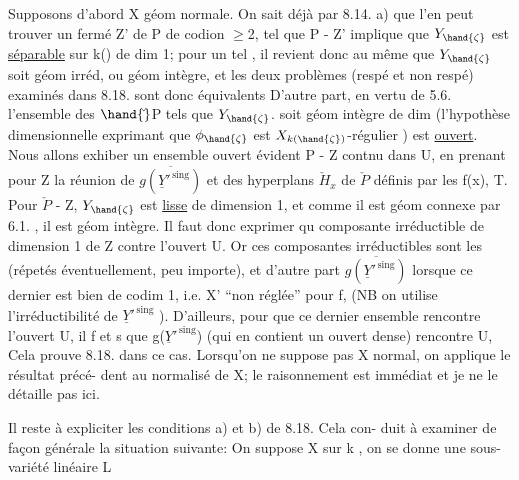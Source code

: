 

Supposons d'abord X géom normale. On sait déjà par 8.14. a)  que
l'en  peut trouver un fermé Z' de P de codion $\geq$2, tel que
\hand{$\zeta\in$} P - Z'  implique que  $Y_{\hand{\zeta}}$  est  \uline{séparable} sur k(\hand{$\zeta$}) de  dim 1; pour
un tel \hand{$\zeta$} , il revient donc au même que $Y_{\hand{\zeta}}$ soit géom irréd, ou géom
intègre, et  les deux problèmes  (respé et non respé) examinés dans
8.18. sont donc équivalents D'autre part, en vertu de 5.6. l'ensemble
 des \hand{$\zeta\in$} $\hand{\check{}}$P  tels que  $Y_{\hand{\zeta}}$.  soit géom intègre de dim  (l'hypothèse
dimensionnelle exprimant que $\phi_{\hand{\zeta}}$ est $X_{k(\hand{\zeta})}$-régulier ) est \uline{ouvert}.
Nous allons exhiber un ensemble ouvert  évident  P - Z  contnu dans U,
en prenant pour  Z la réunion de  $\overline{g(\underline{Y}'^{\,\mathrm{sing}})}$  et des hyperplans $\check{H}_x$
de $\check{P}$  définis par les  f(x),  T.  Pour \hand{$\zeta\in$} $\check{P}$ - Z,  $Y_{\hand{\zeta}}$  est \uline{lisse}
de dimension 1, et comme il est géom connexe par 6.1. , il est géom
intègre.  Il faut donc  exprimer qu  composante irréductible
de dimension  1 de Z  contre l'ouvert U.  Or ces composantes
irréductibles sont les    (répetés éventuellement, peu importe), et
d'autre part $\overline{g(\underline{Y}'^{\,\mathrm{sing}})}$  lorsque  ce dernier  est bien de codim 1, i.e.
X' ``non réglée'' pour f, (NB on utilise l'irréductibilité de  $\underline{Y}'^{\,\mathrm{sing}}$ ).
D'ailleurs, pour que ce dernier ensemble rencontre  l'ouvert U,
il f et s  que  g($\underline{Y}'^{\,\mathrm{sing}}$)  (qui en contient un ouvert dense) rencontre
U,  Cela prouve 8.18. dans ce
cas.  Lorsqu'on ne suppose pas X normal, on applique le résultat précé-%
dent au normalisé de X; le raisonnement est immédiat et je ne le détaille
pas ici.  

Il reste à expliciter  les conditions a) et b) de 8.18. Cela con-%
duit à examiner de façon générale la situation suivante:  On suppose
X  sur k , on se donne une sous-variété linéaire  L 

